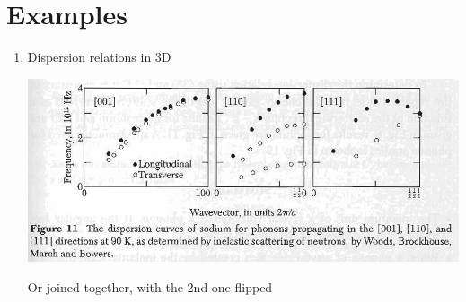 \documentclass{article}
\theoremstyle{remark}
\theoremstyle{remark}
\begin{document}
\section*{Examples}
\begin{enumerate}
    \item Dispersion relations in 3D
    \begin{center}
        \includegraphics*[width=0.8\linewidth]{cmp_dispersion_3d_sodium.png}
    \end{center}

    Or joined together, with the 2nd one flipped


\end{enumerate}
\end{document}
